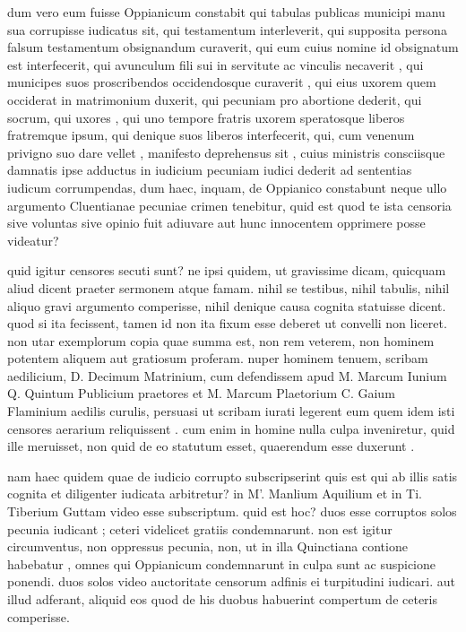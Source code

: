  dum vero eum fuisse Oppianicum constabit qui tabulas publicas municipi manu sua corrupisse iudicatus sit, qui testamentum interleverit, qui supposita persona falsum testamentum obsignandum curaverit, qui eum cuius nomine id obsignatum est interfecerit, qui avunculum fili sui in servitute ac vinculis necaverit , qui municipes suos proscribendos occidendosque curaverit , qui eius uxorem quem occiderat in matrimonium duxerit, qui pecuniam pro abortione dederit, qui socrum, qui uxores , qui uno tempore fratris uxorem speratosque liberos fratremque ipsum, qui denique suos liberos interfecerit, qui, cum venenum privigno suo dare vellet , manifesto deprehensus sit , cuius ministris consciisque damnatis ipse adductus in iudicium pecuniam iudici dederit ad sententias iudicum corrumpendas, dum haec, inquam, de Oppianico constabunt neque ullo argumento Cluentianae pecuniae crimen tenebitur, quid est quod te ista censoria sive voluntas sive opinio fuit adiuvare aut hunc innocentem opprimere posse videatur?

 quid igitur censores secuti sunt? ne ipsi quidem, ut gravissime dicam, quicquam aliud dicent praeter sermonem atque famam. nihil se testibus, nihil tabulis, nihil aliquo gravi argumento comperisse, nihil denique causa cognita statuisse dicent. quod si ita fecissent, tamen id non ita fixum esse deberet ut convelli non liceret. non utar exemplorum copia quae summa est, non rem veterem, non hominem potentem aliquem aut gratiosum proferam. nuper hominem tenuem, scribam aedilicium, D. Decimum Matrinium, cum defendissem apud M. Marcum Iunium Q. Quintum Publicium praetores et M. Marcum Plaetorium C. Gaium Flaminium aedilis curulis, persuasi ut scribam iurati legerent eum quem idem isti censores aerarium reliquissent . cum enim in homine nulla culpa inveniretur, quid ille meruisset, non quid de eo statutum esset, quaerendum esse duxerunt .

 nam haec quidem quae de iudicio corrupto subscripserint quis est qui ab illis satis cognita et diligenter iudicata arbitretur? in M'. Manlium Aquilium et in Ti. Tiberium Guttam video esse subscriptum. quid est hoc? duos esse corruptos solos pecunia iudicant ; ceteri videlicet gratiis condemnarunt. non est igitur circumventus, non oppressus pecunia, non, ut in illa Quinctiana contione habebatur , omnes qui Oppianicum condemnarunt in culpa sunt ac suspicione ponendi. duos solos video auctoritate censorum adfinis ei turpitudini iudicari. aut illud adferant, aliquid eos quod de his duobus habuerint compertum de ceteris comperisse.

